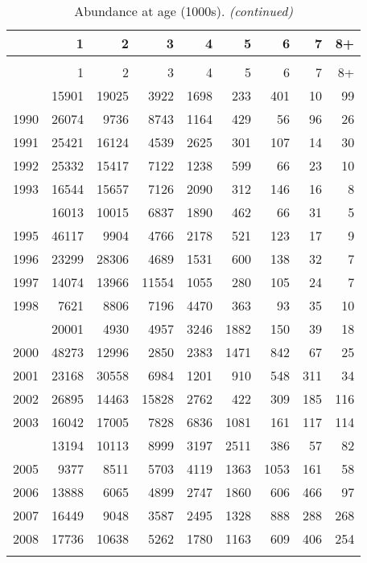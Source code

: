 \documentclass[
]{article}
\begin{document}
\begin{longtable}[t]{lrrrrrrrr}
\caption{\label{tab:NAA-table}Abundance at age (1000s).}\\
\toprule
  & 1 & 2 & 3 & 4 & 5 & 6 & 7 & 8+\\
\midrule
\endfirsthead
\caption[]{Abundance at age (1000s). \textit{(continued)}}\\
\toprule
  & 1 & 2 & 3 & 4 & 5 & 6 & 7 & 8+\\
\midrule
\endhead

\endfoot
\bottomrule
\endlastfoot
1989 & 15901 & 19025 & 3922 & 1698 & 233 & 401 & 10 & 99\\
1990 & 26074 & 9736 & 8743 & 1164 & 429 & 56 & 96 & 26\\
1991 & 25421 & 16124 & 4539 & 2625 & 301 & 107 & 14 & 30\\
1992 & 25332 & 15417 & 7122 & 1238 & 599 & 66 & 23 & 10\\
1993 & 16544 & 15657 & 7126 & 2090 & 312 & 146 & 16 & 8\\
\addlinespace
1994 & 16013 & 10015 & 6837 & 1890 & 462 & 66 & 31 & 5\\
1995 & 46117 & 9904 & 4766 & 2178 & 521 & 123 & 17 & 9\\
1996 & 23299 & 28306 & 4689 & 1531 & 600 & 138 & 32 & 7\\
1997 & 14074 & 13966 & 11554 & 1055 & 280 & 105 & 24 & 7\\
1998 & 7621 & 8806 & 7196 & 4470 & 363 & 93 & 35 & 10\\
\addlinespace
1999 & 20001 & 4930 & 4957 & 3246 & 1882 & 150 & 39 & 18\\
2000 & 48273 & 12996 & 2850 & 2383 & 1471 & 842 & 67 & 25\\
2001 & 23168 & 30558 & 6984 & 1201 & 910 & 548 & 311 & 34\\
2002 & 26895 & 14463 & 15828 & 2762 & 422 & 309 & 185 & 116\\
2003 & 16042 & 17005 & 7828 & 6836 & 1081 & 161 & 117 & 114\\
\addlinespace
2004 & 13194 & 10113 & 8999 & 3197 & 2511 & 386 & 57 & 82\\
2005 & 9377 & 8511 & 5703 & 4119 & 1363 & 1053 & 161 & 58\\
2006 & 13888 & 6065 & 4899 & 2747 & 1860 & 606 & 466 & 97\\
2007 & 16449 & 9048 & 3587 & 2495 & 1328 & 888 & 288 & 268\\
2008 & 17736 & 10638 & 5262 & 1780 & 1163 & 609 & 406 & 254\\
\addlinespace

\end{longtable}
\end{document}
